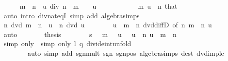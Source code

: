 \begin{isabellebody}
\ \ \ \ \isamarkupfalse%
\ {\isachardoublequoteopen}{\isacharparenleft}{\kern0pt}m\ {\isacharasterisk}{\kern0pt}\ n\ {\isacharminus}{\kern0pt}\ u{\isacharparenright}{\kern0pt}\ div\ n\ {\isacharequal}{\kern0pt}\ m\ {\isacharminus}{\kern0pt}\ {}{\isachardoublequoteclose}\ \ {\isachardoublequoteopen}u\ {\isachargreater}{\kern0pt}\ {}{\isachardoublequoteclose}\isanewline
\ \ \ \ \ \ \isamarkupfalse%
\ {\isacartoucheopen}{}\ {\isacharless}{\kern0pt}\ m{\isacartoucheclose}\ {\isacartoucheopen}u\ {\isacharless}{\kern0pt}\ n{\isacartoucheclose}\ that\isanewline
\ \ \ \ \ \ \isamarkupfalse%
\ {\isacharparenleft}{\kern0pt}auto\ intro{\isacharcolon}{\kern0pt}\ div{\isacharunderscore}{\kern0pt}nat{\isacharunderscore}{\kern0pt}eqI\ simp\ add{\isacharcolon}{\kern0pt}\ algebra{\isacharunderscore}{\kern0pt}simps{\isacharparenright}{\kern0pt}\isanewline
\ \ \ \ \isamarkupfalse%
\ \isamarkupfalse%
\ {\isachardoublequoteopen}n\ dvd\ m\ {\isacharasterisk}{\kern0pt}\ n\ {\isacharminus}{\kern0pt}\ u\ {\isasymlongleftrightarrow}\ n\ dvd\ u{\isachardoublequoteclose}\isanewline
\ \ \ \ \ \ \isamarkupfalse%
\ {\isacartoucheopen}u\ {\isasymle}\ m\ {\isacharasterisk}{\kern0pt}\ n{\isacartoucheclose}\ dvd{\isacharunderscore}{\kern0pt}diffD{}\ {\isacharbrackleft}{\kern0pt}of\ n\ {\isachardoublequoteopen}m\ {\isacharasterisk}{\kern0pt}\ n{\isachardoublequoteclose}\ u{\isacharbrackright}{\kern0pt}\isanewline
\ \ \ \ \ \ \isamarkupfalse%
\ auto\isanewline
\ \ \ \ \isamarkupfalse%
\ \isamarkupfalse%
\ {\isacharquery}{\kern0pt}thesis\isanewline
\ \ \ \ \ \ \isamarkupfalse%
\ {\isacartoucheopen}s\ {\isasymnoteq}\ {}{\isacartoucheclose}\ {\isacartoucheopen}m\ {\isachargreater}{\kern0pt}\ {}{\isacartoucheclose}\ {\isacartoucheopen}u\ {\isachargreater}{\kern0pt}\ {}{\isacartoucheclose}\ {\isacartoucheopen}u\ {\isacharless}{\kern0pt}\ n{\isacartoucheclose}\ {\isacartoucheopen}u\ {\isasymle}\ m\ {\isacharasterisk}{\kern0pt}\ n{\isacartoucheclose}\isanewline
\ \ \ \ \ \ \isamarkupfalse%
\ {\isacharparenleft}{\kern0pt}simp\ only{\isacharcolon}{\kern0pt}\ {\isacharasterisk}{\kern0pt}{\isacharcomma}{\kern0pt}\ simp\ only{\isacharcolon}{\kern0pt}\ l\ q\ divide{\isacharunderscore}{\kern0pt}int{\isacharunderscore}{\kern0pt}unfold{\isacharparenright}{\kern0pt}\isanewline
\ \ \ \ \ \ \ \ {\isacharparenleft}{\kern0pt}auto\ simp\ add{\isacharcolon}{\kern0pt}\ sgn{\isacharunderscore}{\kern0pt}mult\ sgn{\isacharunderscore}{\kern0pt}{}{\isacharunderscore}{\kern0pt}{}\ sgn{\isacharunderscore}{\kern0pt}{}{\isacharunderscore}{\kern0pt}pos\ algebra{\isacharunderscore}{\kern0pt}simps\ dest{\isacharcolon}{\kern0pt}\ dvd{\isacharunderscore}{\kern0pt}imp{\isacharunderscore}{\kern0pt}le{\isacharparenright}{\kern0pt}\isanewline

\end{isabellebody}
